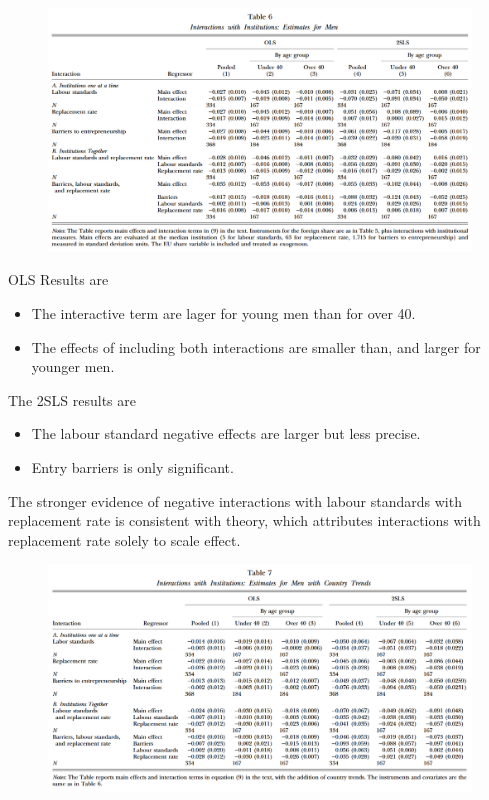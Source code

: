 \documentclass[../root]{subfiles}
\begin{document}
    \begin{figure}[h]
        \includegraphics[width=15cm]{0529sugiyama/Table6.png}
    \end{figure}
    OLS Results are
    \begin{itemize}
        \item The interactive term are lager for young men than for over 40. 
        \item The effects of including both interactions are smaller than, and larger for younger men.
    \end{itemize}
    
    The 2SLS results are
    \begin{itemize}
        \item The labour standard negative effects are larger but less precise. 
        \item Entry barriers is only significant.
    \end{itemize}
    
    The stronger evidence of negative interactions with labour standards with replacement rate is consistent with theory, which attributes interactions with replacement rate solely to scale effect.
    
    \begin{figure}[h]
        \includegraphics[width=15cm]{0529sugiyama/Table7.png}
    \end{figure}
    
\end{document}
